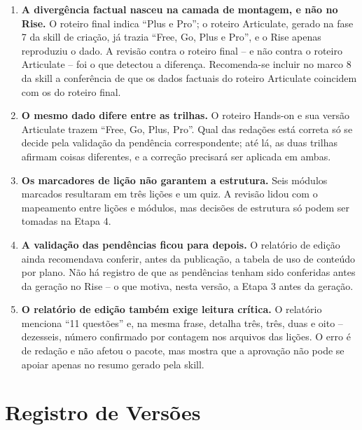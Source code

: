 \documentclass[12pt,a4paper]{article}
\begin{document}
\begin{enumerate}[leftmargin=*]
\item \textbf{A divergência factual nasceu na camada de montagem, e não no Rise.} O roteiro final indica ``Plus e Pro''; o roteiro Articulate, gerado na fase 7 da skill de criação, já trazia ``Free, Go, Plus e Pro'', e o Rise apenas reproduziu o dado. A revisão contra o roteiro final -- e não contra o roteiro Articulate -- foi o que detectou a diferença. Recomenda-se incluir no marco 8 da skill a conferência de que os dados factuais do roteiro Articulate coincidem com os do roteiro final.

\item \textbf{O mesmo dado difere entre as trilhas.} O roteiro Hands-on e sua versão Articulate trazem ``Free, Go, Plus, Pro''. Qual das redações está correta só se decide pela validação da pendência correspondente; até lá, as duas trilhas afirmam coisas diferentes, e a correção precisará ser aplicada em ambas.

\item \textbf{Os marcadores de lição não garantem a estrutura.} Seis módulos marcados resultaram em três lições e um quiz. A revisão lidou com o mapeamento entre lições e módulos, mas decisões de estrutura só podem ser tomadas na Etapa 4.

\item \textbf{A validação das pendências ficou para depois.} O relatório de edição ainda recomendava conferir, antes da publicação, a tabela de uso de conteúdo por plano. Não há registro de que as pendências tenham sido conferidas antes da geração no Rise -- o que motiva, nesta versão, a Etapa 3 antes da geração.

\item \textbf{O relatório de edição também exige leitura crítica.} O relatório menciona ``11 questões'' e, na mesma frase, detalha três, três, duas e oito -- dezesseis, número confirmado por contagem nos arquivos das lições. O erro é de redação e não afetou o pacote, mas mostra que a aprovação não pode se apoiar apenas no resumo gerado pela skill.
\end{enumerate}

\section{Registro de Versões}
\end{document}
